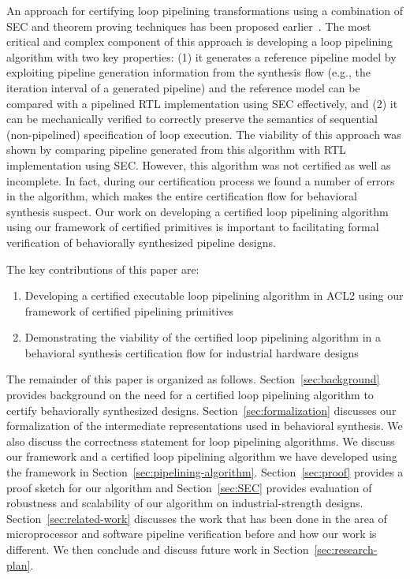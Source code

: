 An approach for certifying loop pipelining transformations using a combination of SEC and 
theorem proving techniques has been proposed earlier~\cite{hrx:dac-12}. The most critical and complex
component of this approach is developing
a loop pipelining algorithm with two key properties: (1) it generates a reference pipeline model 
by exploiting pipeline generation information from the synthesis flow (e.g., the iteration interval 
of a generated pipeline) and the reference model can be compared with a pipelined RTL 
implementation using SEC effectively, and (2) it can be mechanically verified to correctly preserve the semantics of
sequential (non-pipelined) specification of loop execution. The viability of 
this approach was shown by comparing pipeline generated from this algorithm with RTL implementation 
using SEC. However, this algorithm was not certified as well as incomplete. 
In fact, during our certification process we found a number of errors in the algorithm, 
which makes the entire certification flow for behavioral synthesis suspect. 
Our work on developing a certified loop pipelining algorithm using our framework of certified 
primitives is important to facilitating formal verification of behaviorally synthesized
 pipeline designs.

\medskip
The key contributions of this paper are:
\begin{enumerate}
\item Developing a certified executable loop pipelining algorithm in ACL2 using our framework of certified pipelining primitives 
\item Demonstrating the viability of the certified loop pipelining algorithm in a behavioral synthesis certification flow for industrial hardware designs
\end{enumerate}

The remainder of this paper is organized as
follows. Section~\ref{sec:background} provides background on the need for a certified loop pipelining algorithm 
to certify behaviorally synthesized designs. Section~\ref{sec:formalization} 
discusses our formalization of the intermediate representations used in behavioral synthesis.
We also discuss the correctness statement for loop pipelining algorithms. 
We discuss our framework and a certified loop pipelining algorithm we have developed using the framework in Section~\ref{sec:pipelining-algorithm}. Section~\ref{sec:proof} provides a proof sketch for our algorithm and Section~\ref{sec:SEC} provides evaluation of robustness and 
scalability of our algorithm on industrial-strength designs. Section~\ref{sec:related-work} discusses the work that has been done in the area of microprocessor and software pipeline verification before and how our work is different. We then conclude and discuss future work in Section~\ref{sec:research-plan}.


